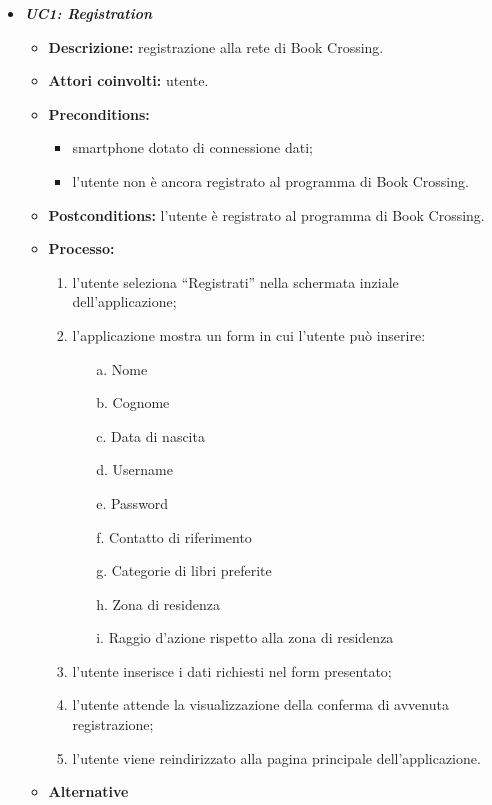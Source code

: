 

\begin{itemize}
	\item \textbf{\textit{UC1: Registration}}
	\begin{itemize}
		\item \textbf{Descrizione:} registrazione alla rete di Book Crossing.
		\item \textbf{Attori coinvolti:} utente.
		\item \textbf{Preconditions:} 
		\begin{itemize}
			\item smartphone dotato di connessione dati;
			\item l’utente non è ancora registrato al programma di Book Crossing.
		\end{itemize}
		\item \textbf{Postconditions:} l’utente è registrato al programma di Book Crossing.
		\item \textbf{Processo:}
		\begin{enumerate}
			\item l’utente seleziona “Registrati” nella schermata inziale dell’applicazione;
			\item l’applicazione mostra un form in cui l'utente può inserire:
			\begin{enumerate}
				\item [a.] Nome
				\item [b.] Cognome
				\item [c.] Data di nascita
				\item [d.] Username
				\item [e.] Password
				\item [f.] Contatto di riferimento
				\item [g.] Categorie di libri preferite
				\item [h.] Zona di residenza
				\item [i.] Raggio d'azione rispetto alla zona di residenza
			\end{enumerate}
			\item l’utente inserisce i dati richiesti nel form presentato;
			\item l'utente attende la visualizzazione della conferma di avvenuta registrazione;
			\item l’utente viene reindirizzato alla pagina principale dell’applicazione.
		\end{enumerate}
		\item \textbf{Alternative}
		\begin{itemize}

\end{itemize}
\end{itemize}
\end{itemize}
